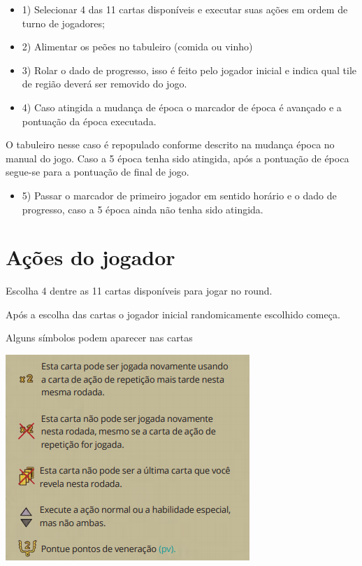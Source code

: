 \documentclass[11pt]{article}
\begin{document}
\begin{itemize}
\item 1) Selecionar 4 das 11 cartas disponíveis e executar suas ações em ordem de turno de jogadores;
\item 2) Alimentar os peões no tabuleiro (comida ou vinho)
\item 3) Rolar o dado de progresso, isso é feito pelo jogador inicial e indica qual tile de região deverá ser removido do jogo.
\item 4) Caso atingida a mudança de época o marcador de época é avançado e a pontuação da época executada.
\end{itemize}
O tabuleiro nesse caso é repopulado conforme descrito na mudança época no manual do jogo. Caso a 5 época tenha sido atingida, após a pontuação de época segue-se para a pontuação de final de jogo.
\begin{itemize}
\item 5) Passar o marcador de primeiro jogador em sentido horário e o dado de progresso, caso a 5 época ainda não tenha sido atingida.
\end{itemize}

\section{Ações do jogador}
\label{sec-6}

Escolha 4 dentre as 11 cartas disponíveis para jogar no round.

Após a escolha das cartas o jogador inicial randomicamente escolhido começa.

Alguns símbolos podem aparecer nas cartas

\includegraphics[width=.9\linewidth]{./img/symbol.png}
\end{document}
